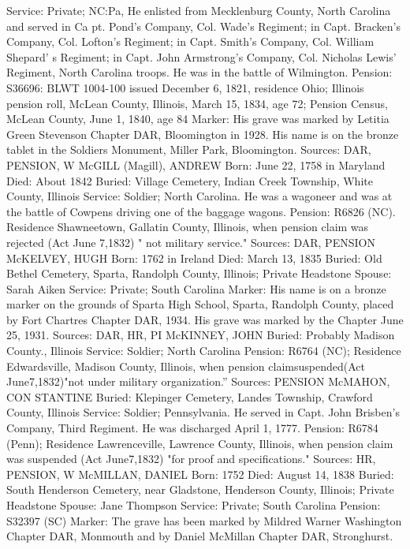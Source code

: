 Service: Private; NC:Pa, He enlisted from Mecklenburg County, North Carolina and served in Ca pt. Pond's Company, Col. Wade's Regiment; in Capt. Bracken's Company, Col. Lofton's Regiment; in Capt. Smith's Company, Col. William Shepard' s Regiment; in Capt. John Armstrong's Company, Col. Nicholas Lewis' Regiment, North Carolina troops. He was in the battle of Wilmington. 
Pension: S36696: BLWT 1004-100 issued December 6, 1821, residence Ohio; Illinois pension roll, McLean County, Illinois, March 15, 1834, age 72; Pension Census, McLean County, June 1, 1840, age 84 
Marker: His grave was marked by Letitia Green Stevenson Chapter DAR, Bloom­ington in 1928. His name is on the bronze tablet in the Soldiers Monument, Miller Park, Bloomington. 
Sources: DAR, PENSION, W 
McGILL (Magill), ANDREW
Born: June 22, 1758 in Maryland
Died: About 1842
Buried: Village Cemetery, Indian Creek Township, White County, Illinois
Service: Soldier; North Carolina. He was a wagoneer and was at the battle of Cowpens driving one of the baggage wagons.
Pension: R6826 (NC). Residence Shawneetown, Gallatin County, Illinois, when pension claim was rejected (Act June 7,1832) " not military service."
Sources: DAR, PENSION 
McKELVEY, HUGH
Born: 1762 in Ireland
Died: March 13, 1835
Buried: Old Bethel Cemetery, Sparta, Randolph County, Illinois; Private Headstone
Spouse: Sarah Aiken
Service: Private; South Carolina 
Marker: His name is on a bronze marker on the grounds of Sparta High School, Sparta, Randolph County, placed by Fort Chartres Chapter DAR, 1934. His grave was marked by the Chapter June 25, 1931. 
Sources: DAR, HR, PI 
McKINNEY, JOHN 
Buried: Probably Madison County., Illinois 
Service: Soldier; North Carolina 
Pension: R6764 (NC); Residence Edwardsville, Madison County, Illinois, when pension claimsuspended(Act June7,1832)"not under military organization.”
Sources: PENSION 
McMAHON, CON STANTINE 
Buried: Klepinger Cemetery, Landes Township, Crawford County, Illinois 
Service: Soldier; Pennsylvania. He served in Capt. John Brisben’s Company, Third Regiment. He was discharged April 1, 1777. 
Pension: R6784 (Penn); Residence Lawrenceville, Lawrence County, Illinois, when pension claim was suspended (Act June7,1832) "for proof and specifications."
Sources: HR, PENSION, W 
McMILLAN, DANIEL
Born: 1752
Died: August 14, 1838
Buried: South Henderson Cemetery, near Gladstone, Henderson County, Illinois; 
Private Headstone
Spouse: Jane Thompson
Service: Private; South Carolina
Pension: S32397 (SC)
Marker: The grave has been marked by Mildred Warner Washington Chapter DAR, Monmouth and by Daniel McMillan Chapter DAR, Stronghurst.
